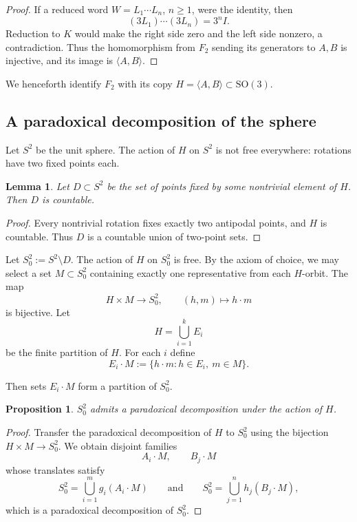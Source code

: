 \documentclass[12pt,a4paper]{article}
\theoremstyle{spaced}
\newtheorem{lemma}{Lemma}[section]
\newtheorem{proposition}{Proposition}[section]
\begin{document}
\begin{proof}
	If a reduced word $W=L_1\cdots L_n$, $n\ge1$, were the identity, then
	\[
		(3L_1)\cdots(3L_n)=3^nI.
	\]
	Reduction to $K$ would make the right side zero and the left side
	nonzero, a contradiction. Thus the homomorphism from $F_2$ sending its
	generators to $A,B$ is injective, and its image is $\langle A,B\rangle$.
\end{proof}

We henceforth identify $F_2$ with its copy
\(H = \langle A,B\rangle \subset \mathrm{SO}(3)\).

\subsection{A paradoxical decomposition of the sphere}
Let $S^2$ be the unit sphere.
The action of $H$ on $S^2$ is not free everywhere: rotations have two fixed points each.

\begin{lemma}\label{lem:fixed_points_countable_polished}
	Let $D\subset S^{2}$ be the set of points fixed by some nontrivial element of $H$. Then $D$ is countable.
\end{lemma}


\begin{proof}
	Every nontrivial rotation fixes exactly two antipodal points, and $H$ is countable.
	Thus $D$ is a countable union of two-point sets.
\end{proof}

Let \(S^2_0 := S^2 \setminus D\).
The action of \(H\) on \(S^2_0\) is free.
By the axiom of choice, we may select a set \(M \subset S^2_0\) containing exactly one
representative from each \(H\)-orbit.
The map
\[
	H\times M \to S^2_0,\qquad (h,m)\mapsto h\cdot m
\]
is bijective.
Let
\[
	H = \bigcup_{i=1}^{k} E_i
\]
be the finite partition of $H$. For each \(i\) define
\[
	E_i \cdot M := \{ h\cdot m : h\in E_i,\ m\in M\}.
\]

\noindent Then sets $E_i\cdot M$ form a partition of $S^2_0$.

\begin{proposition}\label{prop:S2_paradoxical_noD-updated}
	\(S^2_0\) admits a paradoxical decomposition under the action of \(H\).
\end{proposition}

\begin{proof}
	Transfer the paradoxical decomposition of \(H\) to \(S^2_0\) using the bijection
	\(H\times M\to S^2_0\).
	We obtain disjoint families
	\[
		A_i\cdot M,\qquad B_j\cdot M
	\]
	whose translates satisfy
	\[
		S^2_0=\bigcup_{i=1}^m g_i(A_i\cdot M)
		\qquad\text{and}\qquad
		S^2_0=\bigcup_{j=1}^n h_j(B_j\cdot M),
	\]
	which is a paradoxical decomposition of \(S^2_0\).
\end{proof}
\end{document}
